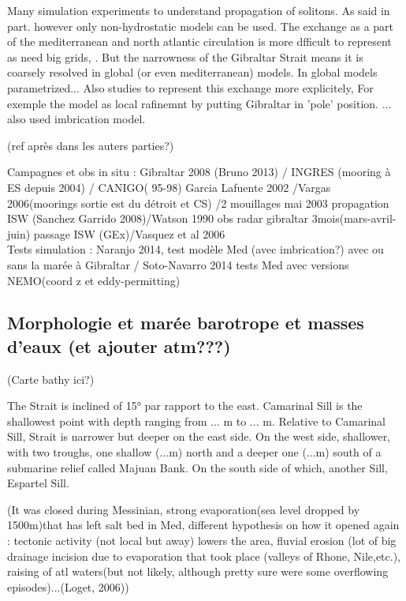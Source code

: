 Many simulation experiments to understand propagation of solitons. As said in part. however only non-hydrostatic models can be used. The exchange as a part of the mediterranean and north atlantic circulation is more dfficult to represent as need big grids, . 
But the narrowness of the Gibraltar Strait means it is coarsely resolved in global (or even mediterranean) models. In global models parametrized...
Also studies to represent this exchange more explicitely, For exemple the model as local rafinemnt by putting Gibraltar in 'pole' position. ... also used imbrication model.




(ref après dans les auters parties?)

Campagnes et obs in situ : Gibraltar 2008 (Bruno 2013) / INGRES (mooring à ES depuis 2004) / CANIGO( 95-98) Garcia Lafuente 2002 /Vargas 2006(moorings sortie est du détroit et CS) /2 mouillages mai 2003 propagation ISW (Sanchez Garrido 2008)/Watson 1990 obs radar gibraltar 3mois(mars-avril-juin) passage ISW (GEx)/Vasquez et al 2006\\

Tests simulation : Naranjo 2014, test modèle Med (avec imbrication?) avec ou sans la marée à Gibraltar / Soto-Navarro 2014 tests Med avec versions NEMO(coord z et eddy-permitting)



\subsection{Morphologie et marée barotrope et masses d'eaux (et ajouter atm???)}

(Carte bathy ici?)

The Strait is inclined of 15° par rapport to the east. Camarinal Sill is the shallowest point with depth ranging from ... m to ... m. Relative to Camarinal Sill, Strait is narrower but deeper on the east side. On the west side, shallower, with two troughs, one shallow (...m) north and a deeper one (...m) south of a submarine relief called Majuan Bank. On the south side of which, another Sill, Espartel Sill.


(It was closed during Messinian, strong evaporation(sea level dropped by 1500m)that has left salt bed in Med, different hypothesis on how it opened again : tectonic activity (not local but away) lowers the area, fluvial erosion (lot of big drainage incision due to evaporation that took place (valleys of Rhone, Nile,etc.), raising of atl waters(but not likely, although pretty sure were some overflowing episodes)...(Loget, 2006)) 


